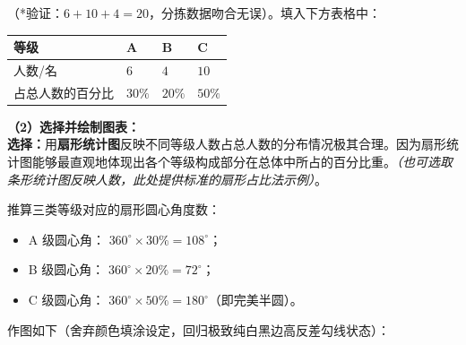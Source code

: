 （*验证：$6+10+4=20$，分拣数据吻合无误）。填入下方表格中：

\vspace{0.2cm}
\begin{center}
\renewcommand{\arraystretch}{1.5}
\begin{tabular}{|>{\centering\arraybackslash}p{3.4cm}|>{\centering\arraybackslash}p{3.4cm}|>{\centering\arraybackslash}p{3.4cm}|>{\centering\arraybackslash}p{3.4cm}|}
  \hline
  \cellcolor{gray!15} 等级 & A & B & C \\
  \hline
  \cellcolor{gray!15} 人数/名 & \textbf{$6$} & \textbf{$4$} & \textbf{$10$} \\
  \hline
  \cellcolor{gray!15} 占总人数的百分比 & \textbf{$30\%$} & \textbf{$20\%$} & \textbf{$50\%$} \\
  \hline
\end{tabular}
\end{center}
\vspace{0.4cm}

\textbf{（2）选择并绘制图表：} \\
\textbf{选择：}用\textbf{扇形统计图}反映不同等级人数占总人数的分布情况极其合理。因为扇形统计图能够最直观地体现出各个等级构成部分在总体中所占的百分比重。\textit{（也可选取条形统计图反映人数，此处提供标准的扇形占比法示例）}。

推算三类等级对应的扇形圆心角度数：
\begin{itemize}
  \item A 级圆心角： $360^\circ \times 30\% = 108^\circ$；
  \item B 级圆心角： $360^\circ \times 20\% = 72^\circ$；
  \item C 级圆心角： $360^\circ \times 50\% = 180^\circ$（即完美半圆）。
\end{itemize}

作图如下（舍弃颜色填涂设定，回归极致纯白黑边高反差勾线状态）：

